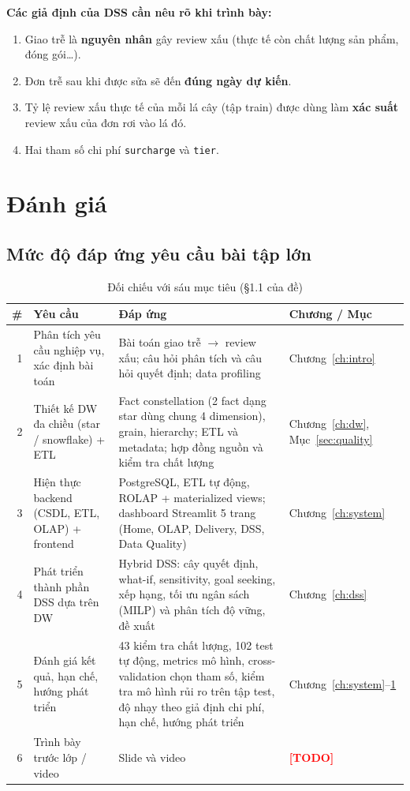 \documentclass[12pt,a4paper]{report}
\newcommand{\todo}[1]{\textcolor{red}{\textbf{[TODO]} #1}}
\newcommand{\code}[1]{\texttt{#1}}
\renewcommand{\_}{\oldunderscore\allowbreak}
\begin{document}
\textbf{Các giả định của DSS cần nêu rõ khi trình bày:}
\begin{enumerate}
\item Giao trễ là \textbf{nguyên nhân} gây review xấu (thực tế còn chất lượng sản phẩm, đóng gói\ldots).
\item Đơn trễ sau khi được sửa sẽ đến \textbf{đúng ngày dự kiến}.
\item Tỷ lệ review xấu thực tế của mỗi lá cây (tập train) được dùng làm \textbf{xác suất} review xấu của đơn rơi vào lá đó.
\item Hai tham số chi phí \code{surcharge} và \code{tier}.
\end{enumerate}

\chapter{Đánh giá}\label{ch:eval}

\section{Mức độ đáp ứng yêu cầu bài tập lớn}

\begin{table}[H]
\centering\small
\caption{Đối chiếu với sáu mục tiêu (§1.1 của đề)}
\begin{tabular}{rL{3.8cm}L{7cm}L{2.4cm}}
\toprule
\# & Yêu cầu & Đáp ứng & Chương / Mục \\
 & Phân tích yêu cầu nghiệp vụ, xác định bài toán & Bài toán giao trễ $\rightarrow$ review xấu; câu hỏi phân tích và câu hỏi quyết định; data profiling & Chương~\ref{ch:intro} \\
2 & Thiết kế DW đa chiều (star / snowflake) + ETL & Fact constellation (2 fact dạng star dùng chung 4 dimension), grain, hierarchy; ETL và metadata; hợp đồng nguồn và kiểm tra chất lượng & Chương~\ref{ch:dw}, Mục~\ref{sec:quality} \\
3 & Hiện thực backend (CSDL, ETL, OLAP) + frontend & PostgreSQL, ETL tự động, ROLAP + materialized views; dashboard Streamlit 5 trang (Home, OLAP, Delivery, DSS, Data Quality) & Chương~\ref{ch:system} \\
4 & Phát triển thành phần DSS dựa trên DW & Hybrid DSS: cây quyết định, what-if, sensitivity, goal seeking, xếp hạng, tối ưu ngân sách (MILP) và phân tích độ vững, đề xuất & Chương~\ref{ch:dss} \\
5 & Đánh giá kết quả, hạn chế, hướng phát triển & 43 kiểm tra chất lượng, 102 test tự động, metrics mô hình, cross-validation chọn tham số, kiểm tra mô hình rủi ro trên tập test, độ nhạy theo giả định chi phí, hạn chế, hướng phát triển & Chương~\ref{ch:system}--\ref{ch:eval} \\
6 & Trình bày trước lớp / video & Slide và video & \todo{} \\
\bottomrule
\end{tabular}
\end{table}
\end{document}
